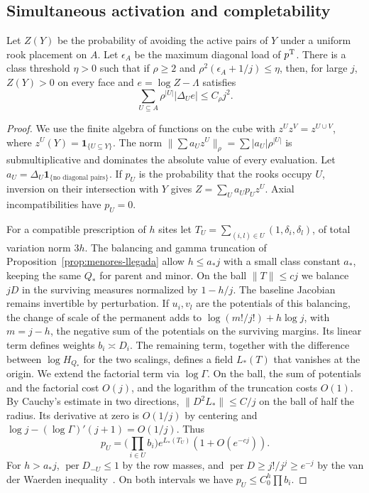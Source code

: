 \subsection{Simultaneous activation and completability}
\begin{proposicion}\label{prop:norma-llegada}
Let \(Z(Y)\) be the probability of avoiding the active pairs of \(Y\) under a uniform rook placement on
\(A\).
Let \(\epsilon_A\) be the maximum diagonal load of \(p^{\rm T}\). There is a class threshold \(\eta>0\)
such that if \(\rho\ge2\) and \(\rho^2(\epsilon_A+1/j)\le\eta\), then, for large \(j\), \(Z(Y)>0\) on
every face and \(e=\log Z-\Lambda\) satisfies
\[
 \sum_{U\subseteq A}\rho^{|U|}|\Delta_Ue|\le C_\rho j^2.
\]
\end{proposicion}
\begin{proof}
We use the finite algebra of functions on the cube with \(z^Uz^V=z^{U\cup V}\), where
\(z^U(Y)=\mathbf1_{\{U\subseteq Y\}}\). The norm \(\|\sum a_Uz^U\|_\rho
=\sum|a_U|\rho^{|U|}\) is submultiplicative and dominates the absolute value of every evaluation. Let
\(a_U=\Delta_U\mathbf1_{\{\text{no diagonal pairs}\}}\). If \(p_U\) is the probability that the rooks
occupy \(U\), inversion on their intersection with \(Y\) gives \(Z=\sum_Ua_Up_U z^U\). Axial
incompatibilities have \(p_U=0\).

For a compatible prescription of \(h\) sites let \(T_U=\sum_{(i,l)\in U}(1,\delta_i,\delta_l)\), of total
variation norm \(3h\). The balancing and gamma truncation of Proposition~\ref{prop:menores-llegada} allow
\(h\le a_*j\) with a small class constant \(a_*\), keeping the same \(Q_*\) for parent and minor. On the
ball \(\|T\|\le c j\) we balance \(jD\) in the surviving measures normalized by \(1-h/j\). The baseline
Jacobian remains invertible by perturbation. If \(u_i,v_l\) are the potentials of this balancing, the
change of scale of the permanent adds to \(\log(m!/j!)+h\log j\), with \(m=j-h\), the negative sum of the
potentials on the surviving margins. Its linear term defines weights \(b_i\asymp D_i\). The remaining
term, together with the difference between \(\log H_{Q_*}\) for the two scalings, defines a field
\(L_*(T)\) that vanishes at the origin. We extend the factorial term via \(\log\Gamma\). On the ball, the
sum of potentials and the factorial cost \(O(j)\), and the logarithm of the truncation costs \(O(1)\). By
Cauchy's estimate in two directions, \(\|D^2L_*\|\le C/j\) on the ball of half the radius. Its derivative
at zero is \(O(1/j)\) by centering and \(\log j-(\log\Gamma)'(j+1)=O(1/j)\). Thus
\[
 p_U=\Big(\prod_{i\in U}b_i\Big)e^{L_*(T_U)}(1+O(e^{-cj})).
\]
For \(h>a_*j\), \(\operatorname{per}D_{-U}\le1\) by the row masses, and \(\operatorname{per}D\ge
j!/j^j\ge e^{-j}\) by the van der Waerden inequality~\cite{egorychev,falikman}. On both intervals we have
\(p_U\le C_0^h\prod
b_i\).


\end{proof}
